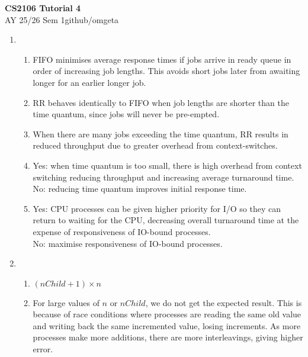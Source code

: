 \documentclass[12pt, a4paper]{article}
\newcommand{\mytitle}{CS2106 Tutorial 4}
\newcommand{\myauthor}{github/omgeta}
\newcommand{\mydate}{AY 25/26 Sem 1}
\begin{document}
\raggedright
\footnotesize
\begin{center}
{\normalsize{\textbf{\mytitle}}} \\
{\footnotesize{\mydate\hspace{2pt}\textemdash\hspace{2pt}\myauthor}}
\end{center}
\begin{enumerate}[Q\arabic*.]
  \item 
    \begin{enumerate}[(\alph*.)]
      \item FIFO minimises average response times if jobs arrive in ready queue in order of increasing job lengths. This avoids short jobs later from awaiting longer for an earlier longer job. 

      \item RR behaves identically to FIFO when job lengths are shorter than the time quantum, since jobs will never be pre-empted. 

      \item When there are many jobs exceeding the time quantum, RR results in reduced throughput due to greater overhead from context-switches. 

      \item Yes: when time quantum is too small, there is high overhead from context switching reducing throughput and increasing average turnaround time.\\
        No: reducing time quantum improves initial response time.

      \item Yes: CPU processes can be given higher priority for I/O so they can return to waiting for the CPU, decreasing overall turnaround time at the expense of responsiveness of IO-bound processes.\\No: maximise responsiveness of IO-bound processes. 
    \end{enumerate}

  \item 
    \begin{enumerate}[(\alph*.)]
      \item $(nChild + 1)\times n$

      \item For large values of $n$ or $nChild$, we do not get the expected result. This is because of race conditions where processes are reading the same old value and writing back the same incremented value, losing increments. As more processes make more additions, there are more interleavings, giving higher error. 



\end{enumerate}
\end{enumerate}
\end{document}
